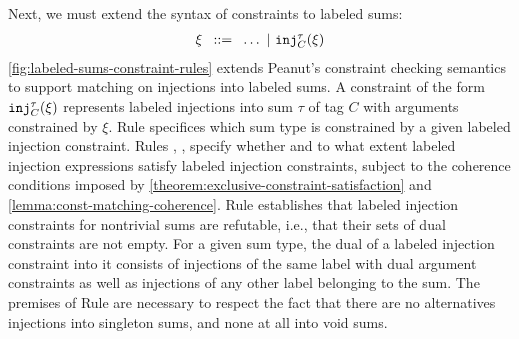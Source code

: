 
Next, we must extend the syntax of constraints to labeled sums:
\[
  \arraycolsep=4pt\begin{array}{lll}
    \xi & ::= & \ldots ~\vert~ \cinj{C}{\tau}{\xi}
  \end{array}
\]
\autoref{fig:labeled-sums-constraint-rules} extends Peanut's constraint checking semantics to support matching on injections into labeled sums.
A constraint of the form $\mathtt{inj}_{C}^{\tau}(\xi)$ represents labeled injections into sum $\tau$ of tag $C$ with arguments constrained by $\xi$.
Rule \CTInj specifices which sum type is constrained by a given labeled injection constraint.
Rules \CSInj, \CMSInjTag, \CMSInjArg specify whether and to what extent labeled injection expressions satisfy labeled injection constraints,
subject to the coherence conditions imposed by \autoref{theorem:exclusive-constraint-satisfaction} and \autoref{lemma:const-matching-coherence}.
Rule \RXInj establishes that labeled injection constraints for nontrivial sums are refutable, i.e., that their sets of dual constraints are not empty.
For a given sum type, the dual of a labeled injection constraint into it consists of injections of the same label with dual argument constraints
as well as injections of any other label belonging to the sum.
The premises of Rule \RXInj are necessary to respect the fact that there are no alternatives injections into singleton sums, and none at all into void sums.



% 
% 








